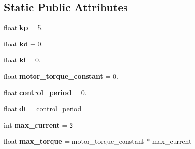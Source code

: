 \subsection*{Static Public Attributes}
\begin{DoxyCompactItemize}
\item 
\mbox{\label{classrobot__properties__solo_1_1config_1_1SoloAbstract_a67bd22d88ac2e10f8891de035bb0063c}} 
float {\bfseries kp} = 5.
\item 
\mbox{\label{classrobot__properties__solo_1_1config_1_1SoloAbstract_a9cf8dc80a83cd7d802051d19fa44acc7}} 
float {\bfseries kd} = 0.
\item 
\mbox{\label{classrobot__properties__solo_1_1config_1_1SoloAbstract_abbe3ed441a3810045e5f1337dca80afa}} 
float {\bfseries ki} = 0.
\item 
\mbox{\label{classrobot__properties__solo_1_1config_1_1SoloAbstract_aa9f2d8b384d84a5beb1d8270f5f7c174}} 
float {\bfseries motor\+\_\+torque\+\_\+constant} = 0.
\item 
\mbox{\label{classrobot__properties__solo_1_1config_1_1SoloAbstract_a73fa8e2d631dd7a230780694b40cddf9}} 
float {\bfseries control\+\_\+period} = 0.
\item 
\mbox{\label{classrobot__properties__solo_1_1config_1_1SoloAbstract_a7a4f82b9bd6375b4985a2fb73f8ea443}} 
float {\bfseries dt} = control\+\_\+period
\item 
\mbox{\label{classrobot__properties__solo_1_1config_1_1SoloAbstract_a941727bb80b8b7c6a9d42db0cd22d826}} 
int {\bfseries max\+\_\+current} = 2
\item 
\mbox{\label{classrobot__properties__solo_1_1config_1_1SoloAbstract_a0de263bbe46b683ca81a59fbfc51052d}} 
float {\bfseries max\+\_\+torque} = motor\+\_\+torque\+\_\+constant $\ast$ max\+\_\+current

\end{DoxyCompactItemize}
